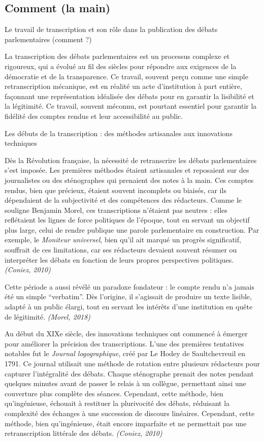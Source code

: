 \subsection{Comment (la main)}

Le travail de transcription et son rôle dans la publication des débats parlementaires (comment ?)

La transcription des débats parlementaires est un processus complexe et rigoureux, qui a évolué au fil des siècles pour répondre aux exigences de la démocratie et de la transparence. Ce travail, souvent perçu comme une simple retranscription mécanique, est en réalité un acte d’institution à part entière, façonnant une représentation idéalisée des débats pour en garantir la lisibilité et la légitimité. Ce travail, souvent méconnu, est pourtant essentiel pour garantir la fidélité des comptes rendus et leur accessibilité au public.

 Les débuts de la transcription : des méthodes artisanales aux innovations techniques

Dès la Révolution française, la nécessité de retranscrire les débats parlementaires s'est imposée. Les premières méthodes étaient artisanales et reposaient sur des journalistes ou des sténographes qui prenaient des notes à la main. Ces comptes rendus, bien que précieux, étaient souvent incomplets ou biaisés, car ils dépendaient de la subjectivité et des compétences des rédacteurs. Comme le souligne Benjamin Morel, ces transcriptions n’étaient pas neutres : elles reflétaient les lignes de force politiques de l’époque, tout en servant un objectif plus large, celui de rendre publique une parole parlementaire en construction. Par exemple, le \emph{Moniteur universel}, bien qu'il ait marqué un progrès significatif, souffrait de ces limitations, car ses rédacteurs devaient souvent résumer ou interpréter les débats en fonction de leurs propres perspectives politiques. \emph{(Coniez, 2010)}

Cette période a aussi révélé un paradoxe fondateur : le compte rendu n’a jamais été un simple \enquote{verbatim}. Dès l’origine, il s’agissait de produire un texte lisible, adapté à un public élargi, tout en servant les intérêts d’une institution en quête de légitimité. \emph{(Morel, 2018)}

Au début du XIXe siècle, des innovations techniques ont commencé à émerger pour améliorer la précision des transcriptions. L'une des premières tentatives notables fut le \emph{Journal logographique}, créé par Le Hodey de Saultchevreuil en 1791. Ce journal utilisait une méthode de rotation entre plusieurs rédacteurs pour capturer l'intégralité des débats. Chaque sténographe prenait des notes pendant quelques minutes avant de passer le relais à un collègue, permettant ainsi une couverture plus complète des séances. Cependant, cette méthode, bien qu’ingénieuse, échouait à restituer la plurivocité des débats, réduisant la complexité des échanges à une succession de discours linéaires. Cependant, cette méthode, bien qu'ingénieuse, était encore imparfaite et ne permettait pas une retranscription littérale des débats. \emph{(Coniez, 2010)}


